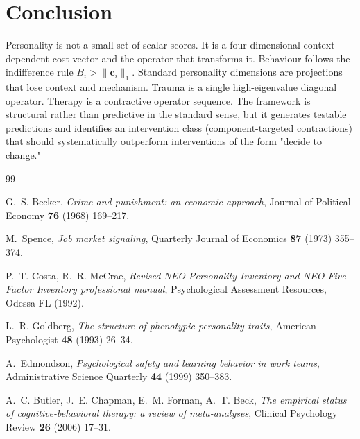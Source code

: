 \documentclass[12pt,a4paper]{article}
\begin{document}
\section{Conclusion}
\label{sec:conclusion}

Personality is not a small set of scalar scores. It is a four-dimensional context-dependent cost vector and the operator that transforms it. Behaviour follows the indifference rule $B_i > \|\mathbf{c}_i\|_1$. Standard personality dimensions are projections that lose context and mechanism. Trauma is a single high-eigenvalue diagonal operator. Therapy is a contractive operator sequence. The framework is structural rather than predictive in the standard sense, but it generates testable predictions and identifies an intervention class (component-targeted contractions) that should systematically outperform interventions of the form "decide to change."

\vspace{1.2em}


\begin{thebibliography}{99}

G.~S. Becker,
\textit{Crime and punishment: an economic approach},
Journal of Political Economy \textbf{76} (1968) 169--217.

M.~Spence,
\textit{Job market signaling},
Quarterly Journal of Economics \textbf{87} (1973) 355--374.

P.~T. Costa, R.~R. McCrae,
\textit{Revised NEO Personality Inventory and NEO Five-Factor Inventory professional manual},
Psychological Assessment Resources, Odessa FL (1992).

L.~R. Goldberg,
\textit{The structure of phenotypic personality traits},
American Psychologist \textbf{48} (1993) 26--34.

A.~Edmondson,
\textit{Psychological safety and learning behavior in work teams},
Administrative Science Quarterly \textbf{44} (1999) 350--383.

A.~C. Butler, J.~E. Chapman, E.~M. Forman, A.~T. Beck,
\textit{The empirical status of cognitive-behavioral therapy: a review of meta-analyses},
Clinical Psychology Review \textbf{26} (2006) 17--31.

\end{thebibliography}
\end{document}
